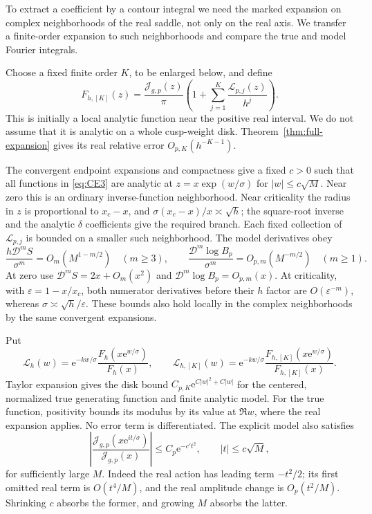 To extract a coefficient by a contour integral we need the marked
expansion on complex neighborhoods of the real saddle, not only on the
real axis. We transfer a finite-order expansion to such neighborhoods and
compare the true and model Fourier integrals.

Choose a fixed finite order $K$, to be enlarged below, and define
\begin{equation}
 F_{h,[K]}(z)=\frac{\mathcal J_{g,p}(z)}\pi
       \left(1+\sum_{j=1}^K\frac{\mathcal L_{p,j}(z)}{h^j}\right).
 \label{eq:CE3}
\end{equation}
This is initially a local analytic function near the positive real
interval. We do not assume that it is analytic on a whole cusp-weight
disk. Theorem~\ref{thm:full-expansion} gives its real relative error
$O_{p,K}(h^{-K-1})$.

The convergent endpoint expansions and compactness give a fixed $c>0$
such that all functions in \eqref{eq:CE3} are analytic at
$z=x\exp(w/\sigma)$ for $|w|\le c\sqrt M$. Near zero this is an
ordinary inverse-function neighborhood. Near criticality the radius
in $z$ is proportional to $x_c-x$, and
$\sigma(x_c-x)/x\asymp\sqrt h$; the square-root inverse and the
analytic $\delta$ coefficients give the required branch. Each fixed
collection of $\mathcal L_{p,j}$ is bounded on a smaller such
neighborhood. The model derivatives obey
\begin{equation}
 \frac{h\mathscr D^mS}{\sigma^m}=O_m(M^{1-m/2})\quad(m\ge3),
 \qquad
 \frac{\mathscr D^m\log B_p}{\sigma^m}=O_{p,m}(M^{-m/2})\quad(m\ge1).
 \label{eq:CE4}
\end{equation}
At zero use $\mathscr D^mS=2x+O_m(x^2)$ and
$\mathscr D^m\log B_p=O_{p,m}(x)$. At criticality, with
$\varepsilon=1-x/x_c$, both numerator derivatives before their
$h$ factor are $O(\varepsilon^{-m})$, whereas
$\sigma\asymp\sqrt h/\varepsilon$.
These bounds also hold locally in the complex neighborhoods by the
same convergent expansions.

Put
\[
 \mathcal L_h(w)=\mathrm{e}^{-kw/\sigma}
   \frac{F_h(x\mathrm{e}^{w/\sigma})}{F_h(x)},\qquad
 \mathcal L_{h,[K]}(w)=\mathrm{e}^{-kw/\sigma}
   \frac{F_{h,[K]}(x\mathrm{e}^{w/\sigma})}{F_{h,[K]}(x)}.
\]
Taylor expansion gives the disk bound $C_{p,K}\mathrm{e}^{C|w|^2+C|w|}$
for the centered, normalized true generating function and finite analytic
model. For the true function, positivity bounds its modulus by its value
at $\Re w$, where the real expansion applies. No error term is
differentiated. The explicit model also satisfies
\begin{equation}
 \left|\frac{\mathcal J_{g,p}(x\mathrm{e}^{it/\sigma})}
                    {\mathcal J_{g,p}(x)}\right|
       \le C_p \mathrm{e}^{-c't^2},\qquad |t|\le c\sqrt M,
 \label{eq:CE5}
\end{equation}
for sufficiently large $M$. Indeed the real action has leading term
$-t^2/2$; its first omitted real term is $O(t^4/M)$, and the real
amplitude change is $O_p(t^2/M)$. Shrinking $c$ absorbs the former,
and growing $M$ absorbs the latter.

